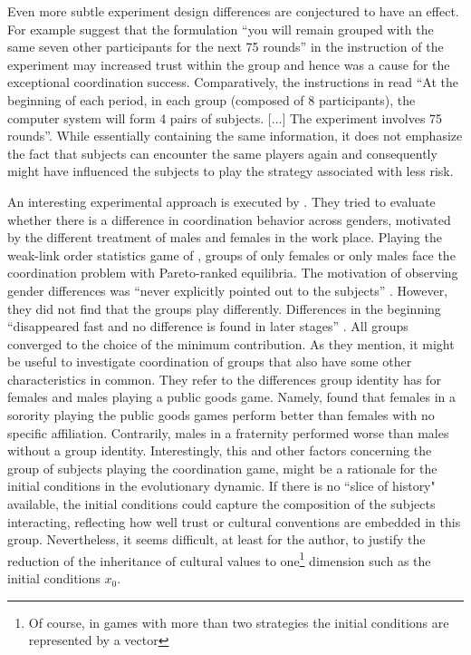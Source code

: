 Even more subtle experiment design differences are conjectured to have an
effect. For example \textcite{devetag_when_2007} suggest that the formulation
``you will remain grouped with the same seven other participants for the next
75 rounds'' in the instruction of the \textcite{rankin_strategic_2000}  
experiment may increased trust within the group and hence was a 
cause for the exceptional coordination success. Comparatively, the 
instructions in \textcite{dubois_optimization_2012} read ``At the beginning
of each period, in each group (composed of 8 participants), the computer
system will form 4 pairs of subjects. [...] The experiment 
involves 75 rounds''\parencite[378]{dubois_optimization_2012}. 
While essentially containing the same information,
it does not emphasize the fact that subjects can encounter the same 
players again and consequently might have influenced the subjects to play
the strategy associated with less risk.

An interesting experimental approach is executed by 
\textcite{dufwenberg_gender_2005}. They tried to evaluate whether 
there is a difference in coordination behavior across genders, motivated by 
the different treatment of males and females in the work place. Playing the 
weak-link order statistics game of \textcite{van_huyck_tacit_1990}, groups of 
only females or only males face the coordination problem with Pareto-ranked 
equilibria. The motivation of observing gender differences was 
``never explicitly pointed  out to the subjects'' 
\parencite{dufwenberg_gender_2005}.
However, they did not find that the groups play
differently. Differences in the beginning ``disappeared fast and no difference
is found in later stages'' \parencite[235]{dufwenberg_gender_2005}. 
All groups converged to the choice of the minimum
contribution. As they mention, it might be useful to investigate 
coordination of groups that also have some other 
characteristics in common. They refer to the differences group 
identity has for females and males playing a 
public goods game. Namely, \textcite{croson_groups_2008} found that 
females in a sorority playing the public goods games perform better than 
females with no specific affiliation. Contrarily, males in a fraternity 
performed worse than males without a group identity. 
Interestingly, this and other factors concerning the group of subjects 
playing the coordination game, might be a rationale for the 
initial conditions in the evolutionary dynamic. If there is no 
``slice of history" available,
the initial conditions could capture the composition of the subjects 
interacting, reflecting how well trust or cultural conventions 
are embedded in this group. 
Nevertheless, it seems difficult, at least for the author, to justify
the reduction of the inheritance of cultural values to 
one\footnote{Of course, in games with more than two strategies 
the initial conditions are represented by a vector} dimension such 
as the initial conditions $x_0$.
